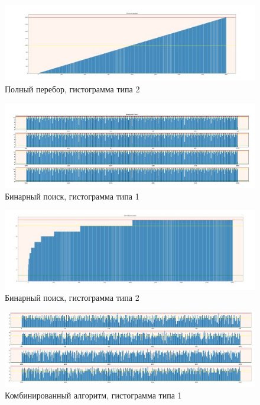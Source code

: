 \documentclass[12pt]{report}
\begin{document}
\begin{figure}[h]
	\begin{center}
		\includegraphics[scale=1]{gist2.jpg}
		\caption{Полный перебор, гистограмма типа 2}
		\label{fig:full}
	\end{center}
\end{figure}

\begin{figure}[h]
	\begin{center}
		\includegraphics[scale=1]{gist3.jpg}
		\caption{Бинарный поиск, гистограмма типа 1}
		\label{fig:full}
	\end{center}
\end{figure}

\begin{figure}[h]
	\begin{center}
		\includegraphics[scale=0.6]{gist4.jpg}
		\caption{Бинарный поиск, гистограмма типа 2}
		\label{fig:full}
	\end{center}
\end{figure}

\begin{figure}[h]
	\begin{center}
		\includegraphics[scale=1]{gist5.jpg}
		\caption{Комбинированный алгоритм, гистограмма типа 1}
		\label{fig:full}
	\end{center}
\end{figure}
\end{document}

